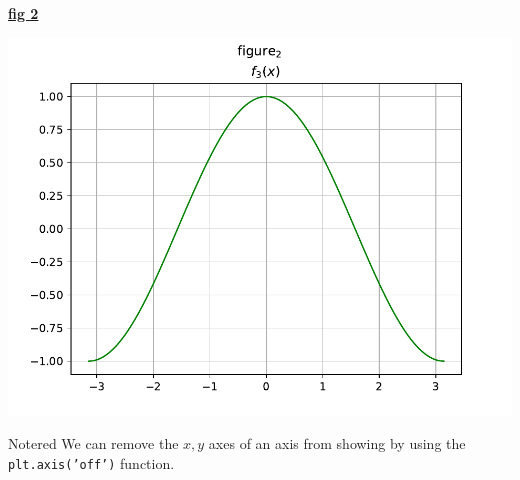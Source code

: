 \textbf{\underline{fig 2}}\\[0.1cm]
\begin{center}
    \includegraphics[height=0.35\textheight]{Chapters/Code/PLT/fig2.pdf}
\end{center}

\newpage

\begin{prettyBox}{Note}{red}
We can remove the \(x , y\) axes of an axis from showing by using the \texttt{plt.axis('off')} function.
\end{prettyBox}

\vspace{1cm}

